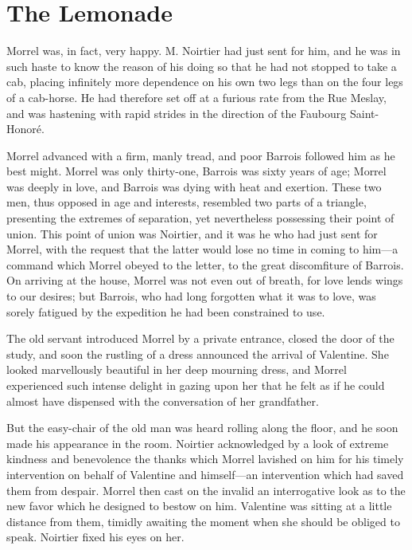 \chapter{The Lemonade}

Morrel was, in fact, very happy. M. Noirtier had just sent for him, and
he was in such haste to know the reason of his doing so that he had not
stopped to take a cab, placing infinitely more dependence on his own
two legs than on the four legs of a cab-horse. He had therefore set off
at a furious rate from the Rue Meslay, and was hastening with rapid
strides in the direction of the Faubourg Saint-Honoré.

Morrel advanced with a firm, manly tread, and poor Barrois followed him
as he best might. Morrel was only thirty-one, Barrois was sixty years
of age; Morrel was deeply in love, and Barrois was dying with heat and
exertion. These two men, thus opposed in age and interests, resembled
two parts of a triangle, presenting the extremes of separation, yet
nevertheless possessing their point of union. This point of union was
Noirtier, and it was he who had just sent for Morrel, with the request
that the latter would lose no time in coming to him—a command which
Morrel obeyed to the letter, to the great discomfiture of Barrois. On
arriving at the house, Morrel was not even out of breath, for love
lends wings to our desires; but Barrois, who had long forgotten what it
was to love, was sorely fatigued by the expedition he had been
constrained to use.

The old servant introduced Morrel by a private entrance, closed the
door of the study, and soon the rustling of a dress announced the
arrival of Valentine. She looked marvellously beautiful in her deep
mourning dress, and Morrel experienced such intense delight in gazing
upon her that he felt as if he could almost have dispensed with the
conversation of her grandfather.

But the easy-chair of the old man was heard rolling along the floor,
and he soon made his appearance in the room. Noirtier acknowledged by a
look of extreme kindness and benevolence the thanks which Morrel
lavished on him for his timely intervention on behalf of Valentine and
himself—an intervention which had saved them from despair. Morrel then
cast on the invalid an interrogative look as to the new favor which he
designed to bestow on him. Valentine was sitting at a little distance
from them, timidly awaiting the moment when she should be obliged to
speak. Noirtier fixed his eyes on her.

